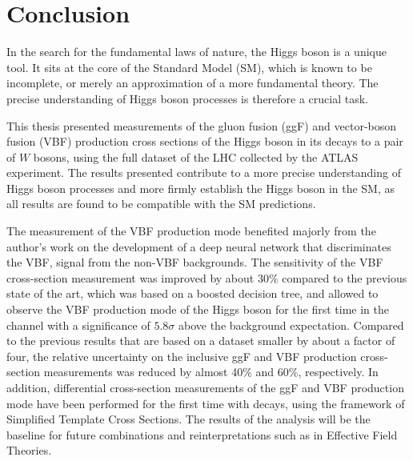 \chapter{Conclusion}
\label{chap:conclusion}
In the search for the fundamental laws of nature, the Higgs boson is a unique tool. 
It sits at the core of the Standard Model (SM), which is known to be incomplete, or merely an approximation of a more fundamental theory. 
The precise understanding of Higgs boson processes is therefore a crucial task. 


This thesis presented measurements of the gluon fusion (ggF) and vector-boson fusion (VBF) production cross sections of the Higgs boson in its decays to a pair of $W$ bosons, using the full \RunTwo dataset of the LHC collected by the ATLAS experiment. 
The results presented contribute to a more precise understanding of Higgs boson processes and more firmly establish the Higgs boson in the SM, as all results are found to be compatible with the SM predictions. 

The measurement of the VBF production mode benefited majorly from the author's work on the development of a deep neural network that discriminates the VBF, \HWW signal from the non-VBF backgrounds. 
The sensitivity of the VBF cross-section measurement was improved by about 30\% compared to the previous state of the art, which was based on a boosted decision tree, and allowed to observe the VBF production mode of the Higgs boson for the first time in the \HWW channel with a significance of $5.8\sigma$ above the background expectation. 
Compared to the previous \RunTwo results that are based on a dataset smaller by about a factor of four, the relative uncertainty on the inclusive ggF and VBF production cross-section measurements was reduced by almost 40\% and 60\%, respectively. 
In addition, differential cross-section measurements of the ggF and VBF production mode have been performed for the first time with \HWW decays, using the framework of Simplified Template Cross Sections. 
The results of the \HWW analysis will be the baseline for future combinations and reinterpretations such as in Effective Field Theories. 


